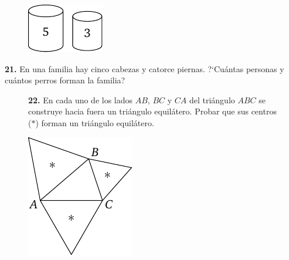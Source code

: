 \documentclass[12pt]{article}  %
\begin{document}
\begin{figure}[h!]
\centering
\footnotesize
\includegraphics[scale=1]{taskbook-4}
\end{figure}

\medskip\noindent
{\bf 21.} En una familia hay cinco cabezas y catorce piernas. ?`Cu\'antas personas y cu\'antos perros forman la familia?
\begin{figure}[h!]
\begin{minipage}[c][][c]{0.7 \textwidth}
{\bf 22.} En cada uno de los lados $AB$, $BC$ y $CA$ del tri\'angulo $ABC$ se construye hacia fuera un tri\'angulo equil\'atero.
Probar que sus centros ($*$) forman un tri\'angulo equil\'atero.\end{minipage}
\hfill
\begin{minipage}[c]{0.2 \textwidth}
\includegraphics[scale=1]{taskbook-6}
\end{minipage}
\end{figure}

\end{document}
